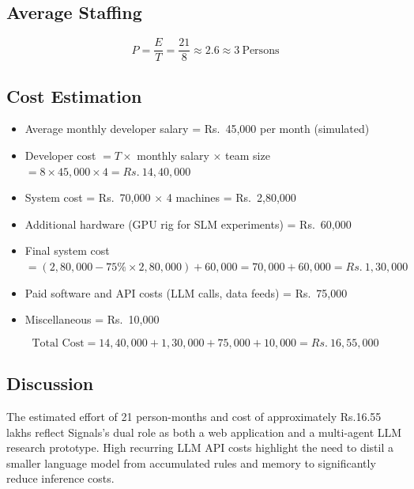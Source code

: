 \documentclass[12pt,a4paper,oneside,openany]{book}
\begin{document}
\begin{itemize}[leftmargin=8mm]
\subsection*{Average Staffing}
\[
P = \frac{E}{T} = \frac{21}{8} \approx 2.6 \approx 3\ \text{Persons}
\]

\newcommand{\rupee}{Rs.}

\subsection*{Cost Estimation}
\begin{itemize}[leftmargin=8mm]
\item Average monthly developer salary = \rupee\ 45{,}000 per month (simulated)
\item Developer cost $= T \times$ monthly salary $\times$ team size $= 8 \times 45{,}000 \times 4 = \rupee\ 14{,}40{,}000$
\item System cost = \rupee\ 70{,}000 $\times$ 4 machines = \rupee\ 2{,}80{,}000
\item Additional hardware (GPU rig for SLM experiments) = \rupee\ 60{,}000
\item Final system cost $= (2{,}80{,}000 - 75\% \times 2{,}80{,}000) + 60{,}000 = 70{,}000 + 60{,}000 = \rupee\ 1{,}30{,}000$
\item Paid software and API costs (LLM calls, data feeds) = \rupee\ 75{,}000
\item Miscellaneous = \rupee\ 10{,}000
\end{itemize}

\[
\text{Total Cost} = 14{,}40{,}000 + 1{,}30{,}000 + 75{,}000 + 10{,}000 = \rupee\ 16{,}55{,}000
\]

\subsection*{Discussion}
The estimated effort of 21 person-months and cost of approximately Rs.16.55 lakhs reflect Signals’s dual role as both a web application and a multi-agent LLM research prototype. High recurring LLM API costs highlight the need to distil a smaller language model from accumulated rules and memory to significantly reduce inference costs.

\clearpage
\thispagestyle{plain}


\end{itemize}
\end{document}
